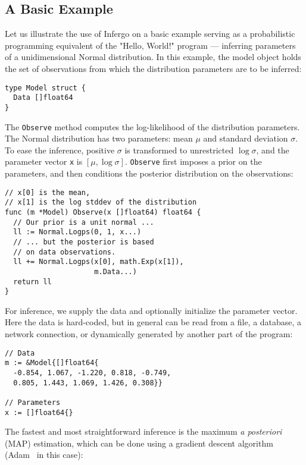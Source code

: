 \documentclass[sigplan,review,10pt,anonymous]{acmart}
\begin{document}
\begin{sloppypar}
\subsection{A Basic Example}
\label{sec:basic-example}

Let us illustrate the use of Infergo on a basic example serving
as a probabilistic programming equivalent of the "Hello, World!"
program --- inferring parameters of a unidimensional Normal
distribution. In this example, the model object holds the set of
observations from which the distribution parameters are to be
inferred:
\begin{lstlisting}
type Model struct {
  Data []float64
}
\end{lstlisting}

The \lstinline{Observe} method computes the log-likelihood of
the distribution parameters. The Normal distribution has two
parameters: mean $\mu$ and standard deviation $\sigma$. To ease
the inference, positive $\sigma$ is transformed to unrestricted
$\log \sigma$, and the parameter vector \lstinline{x} is $[\mu,
\log \sigma]$. \lstinline{Observe} first imposes a prior on the
parameters, and then conditions the posterior distribution on
the observations:

\begin{lstlisting}
// x[0] is the mean,
// x[1] is the log stddev of the distribution
func (m *Model) Observe(x []float64) float64 {
  // Our prior is a unit normal ...
  ll := Normal.Logps(0, 1, x...)
  // ... but the posterior is based 
  // on data observations.
  ll += Normal.Logps(x[0], math.Exp(x[1]),
                     m.Data...)
  return ll
}
\end{lstlisting}

For inference, we supply the data and optionally initialize the
parameter vector. Here the data is hard-coded, but in general
can be read from a file, a database, a network connection,
or dynamically generated by another part of the program:

\begin{lstlisting}
// Data
m := &Model{[]float64{
  -0.854, 1.067, -1.220, 0.818, -0.749,
  0.805, 1.443, 1.069, 1.426, 0.308}}

// Parameters
x := []float64{}
\end{lstlisting}
  
The fastest and most straightforward inference is the maximum
\textit{a posteriori} (MAP) estimation, which can be done using
a gradient descent algorithm (Adam~\cite{KB15} in this case):


\end{sloppypar}
\end{document}
